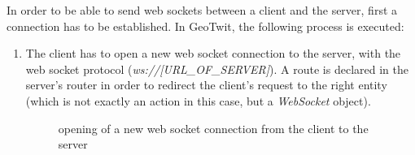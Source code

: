 \documentclass[a4paper,11pt]{report}
\begin{document}
In order to be able to send web sockets between a client and the server, first a connection has to be established. In GeoTwit, the following process is executed:
\begin{enumerate}
	\item The client has to open a new web socket connection to the server, with the web socket protocol (\emph{ws://[URL\_OF\_SERVER]}). A route is declared in the server's router in order to redirect the client's request to the right entity (which is not exactly an action in this case, but a \emph{WebSocket} object).
	\begin{figure}[H]
	\vspace{-5pt}
	\begin{center}
	\vspace{-5pt}
	\caption{opening of a new web socket connection from the client to the server}
	\end{center}
	\end{figure}
	\vspace{-20pt}


\end{enumerate}
\end{document}
